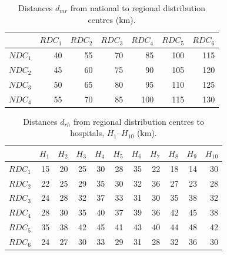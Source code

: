 \documentclass[a4paper]{elsarticle}
\begin{document}
{%
\begin{table}[htbp]
\centering
\caption{Distances $d_{mr}$ from national to regional distribution centres (km).}
\label{tab:A8}
\begin{tabular}{lrrrrrr}
\toprule
 & $RDC_1$ & $RDC_2$ & $RDC_3$ & $RDC_4$ & $RDC_5$ & $RDC_6$ \\
\midrule
$NDC_1$ & 40 & 55 & 70 & 85 & 100 & 115 \\
$NDC_2$ & 45 & 60 & 75 & 90 & 105 & 120 \\
$NDC_3$ & 50 & 65 & 80 & 95 & 110 & 125 \\
$NDC_4$ & 55 & 70 & 85 & 100 & 115 & 130 \\
\bottomrule
\end{tabular}
\end{table}

\begin{table}[htbp]
\centering
\footnotesize
\setlength{\tabcolsep}{4pt}
\caption{Distances $d_{rh}$ from regional distribution centres to hospitals, $H_1$--$H_{10}$ (km).}
\label{tab:A9a}
\begin{tabular}{lrrrrrrrrrr}
\toprule
 & $H_{1}$ & $H_{2}$ & $H_{3}$ & $H_{4}$ & $H_{5}$ & $H_{6}$ & $H_{7}$ & $H_{8}$ & $H_{9}$ & $H_{10}$ \\
\midrule
$RDC_1$ & 15 & 20 & 25 & 30 & 28 & 35 & 22 & 18 & 14 & 30 \\
$RDC_2$ & 22 & 25 & 29 & 35 & 30 & 32 & 36 & 27 & 23 & 28 \\
$RDC_3$ & 24 & 28 & 32 & 37 & 33 & 31 & 30 & 35 & 38 & 32 \\
$RDC_4$ & 28 & 30 & 35 & 40 & 37 & 39 & 36 & 42 & 45 & 38 \\
$RDC_5$ & 35 & 38 & 42 & 45 & 41 & 43 & 40 & 44 & 48 & 42 \\
$RDC_6$ & 24 & 27 & 30 & 33 & 29 & 31 & 28 & 32 & 36 & 30 \\
\bottomrule
\end{tabular}
\end{table}

}
\end{document}
